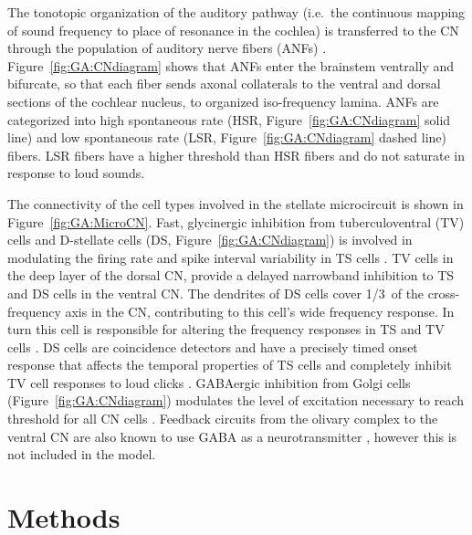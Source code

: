 \smallskip{} 

The tonotopic organization of the auditory pathway (i.e.\ the
continuous mapping of sound frequency to place of resonance in the
cochlea) is transferred to the CN through the population of auditory
nerve fibers (ANFs)
\citep{Lorente:1981}. Figure~\ref{fig:GA:CNdiagram} shows that ANFs
enter the brainstem ventrally and bifurcate, so that each fiber sends
axonal collaterals to the ventral and dorsal sections of the cochlear
nucleus, to organized iso-frequency lamina. ANFs are categorized into
high spon\-taneous rate (HSR, Figure~\ref{fig:GA:CNdiagram} solid line)
and low spontaneous rate (LSR, Figure~\ref{fig:GA:CNdiagram} dashed
line) fibers. LSR fibers have a higher threshold than HSR fibers and
do not saturate in response to loud sounds.

\smallskip{} 

The connectivity of the cell types involved in the stellate
microcircuit is shown in Figure~\ref{fig:GA:MicroCN}. Fast,
glycinergic inhibition from tuberculoventral (TV) cells and D-stellate
cells (DS, Figure~\ref{fig:GA:CNdiagram}) is involved in modulating
the firing rate and spike interval variability in TS cells
\citep{FerragamoGoldingEtAl:1998,WickesbergOertel:1993}. TV cells in
the deep layer of the dorsal CN, provide a delayed narrowband
inhibition to TS and DS cells in the ventral CN\@.  The dendrites of
DS cells cover 1/3~of the cross-frequency axis in the CN, contributing
to this cell's wide frequency response. In turn this cell is
responsible for altering the frequency responses in TS and TV cells
\citep{SpirouDavisEtAl:1999}. DS cells are coincidence detectors and
have a precisely timed onset response that affects the temporal
properties of TS cells
\citep{PaoliniClareyEtAl:2005,RhodeGreenberg:1994a} and completely
inhibit TV cell responses to loud clicks
\citep{SpirouDavisEtAl:1999}. GABAergic inhibition from Golgi cells
(Figure~\ref{fig:GA:CNdiagram}) modulates the level of excitation
necessary to reach threshold for all CN cells
\citep{CasparyBackoffEtAl:1994,FerragamoGoldingEtAl:1998}. Feedback
circuits from the olivary complex to the ventral CN are also known to
use GABA as a neurotransmitter \citep{SaintMorestEtAl:1989}, however
this is not included in the model.

\smallskip{} 

\section{Methods}

